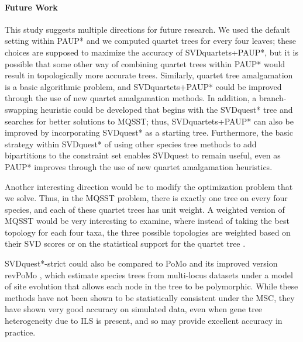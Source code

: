\paragraph{Future Work}

This study suggests multiple directions  for future research.
We used the default setting within PAUP* and 
we computed quartet trees for every four leaves; these choices are  supposed  to maximize the accuracy of SVDquartets+PAUP*, 
but it is possible that some other
way of combining quartet trees within PAUP* would result in topologically more accurate trees.
Similarly, quartet tree amalgamation is a basic algorithmic problem, and
SVDquartets+PAUP* could be improved through the use of new quartet amalgamation methods.
In addition, a branch-swapping heuristic could be developed that begins with the SVDquest* tree and searches for
better solutions to MQSST; thus, 
 SVDquartets+PAUP* can also be improved by incorporating SVDquest* as a starting tree. 
Furthermore, the basic strategy within SVDquest* of using other species tree methods to add bipartitions to the constraint set
enables SVDquest to remain useful, even as PAUP* improves through the use of new quartet amalgamation heuristics.
 
Another interesting direction would be to modify the optimization problem that we solve.
Thus, in the MQSST problem, there is exactly one tree on every four species, and  
each of these quartet trees has unit weight. 
A weighted version of MQSST would be very interesting to examine, where
instead of taking the best topology for each four taxa, the three
possible topologies are weighted based on their SVD scores
or on the statistical support for
the quartet tree \cite{GaitherKubatko2016}.

 
 SVDquest*-strict could also be compared to PoMo \cite{pomo} and its improved version revPoMo \cite{revPomo}, which
estimate species trees from multi-locus datasets under a model of site evolution that allows each node in the tree to be polymorphic. While these methods have not been shown to be statistically consistent under the MSC, they have shown very good accuracy on simulated data, even when gene tree heterogeneity due to ILS is present, and so may provide
excellent accuracy in practice.
   
